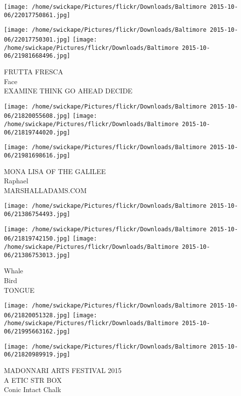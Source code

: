 \documentclass[10pt,letterpaper]{article}
\begin{document}
\texttt{[image: /home/swickape/Pictures/flickr/Downloads/Baltimore 2015-10-06/22017750861.jpg]}

\vspace{0.25in}
\texttt{[image: /home/swickape/Pictures/flickr/Downloads/Baltimore 2015-10-06/22017750301.jpg]}
\texttt{[image: /home/swickape/Pictures/flickr/Downloads/Baltimore 2015-10-06/21981668496.jpg]}

FRUTTA FRESCA\\
Face\\
EXAMINE THINK GO AHEAD DECIDE\\
\pagebreak

\texttt{[image: /home/swickape/Pictures/flickr/Downloads/Baltimore 2015-10-06/21820055608.jpg]}
\texttt{[image: /home/swickape/Pictures/flickr/Downloads/Baltimore 2015-10-06/21819744020.jpg]}

\texttt{[image: /home/swickape/Pictures/flickr/Downloads/Baltimore 2015-10-06/21981698616.jpg]}

MONA LISA OF THE GALILEE\\
Raphael\\
MARSHALLADAMS.COM\\
\pagebreak

\texttt{[image: /home/swickape/Pictures/flickr/Downloads/Baltimore 2015-10-06/21386754493.jpg]}

\vspace{0.25in}
\texttt{[image: /home/swickape/Pictures/flickr/Downloads/Baltimore 2015-10-06/21819742150.jpg]}
\texttt{[image: /home/swickape/Pictures/flickr/Downloads/Baltimore 2015-10-06/21386753013.jpg]}

Whale\\
Bird\\
TONGUE\\
\pagebreak

\texttt{[image: /home/swickape/Pictures/flickr/Downloads/Baltimore 2015-10-06/21820051328.jpg]}
\texttt{[image: /home/swickape/Pictures/flickr/Downloads/Baltimore 2015-10-06/21995663162.jpg]}

\texttt{[image: /home/swickape/Pictures/flickr/Downloads/Baltimore 2015-10-06/21820989919.jpg]}

MADONNARI ARTS FESTIVAL 2015\\
A ETIC STR BOX\\
Conic Intact Chalk\\
\pagebreak
\end{document}
